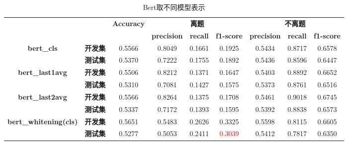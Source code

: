 \documentclass[11pt]{article}
\begin{document}
\begin{CJK}{UTF8}{gkai}
\begin{table}[htbp]\small
  \centering
  \begin{tabular}{cc|c|ccc|ccc}
    \hline
    \multicolumn{2}{c}{\multirow{2}[0]{*}{\textcolor[rgb]{ 1,  0,  0}{}}} & \multirow{2}[0]{*}{\textbf{Accuracy}} & \multicolumn{3}{c}{\textbf{离题}} & \multicolumn{3}{c}{\textbf{不离题}} \\
    \multicolumn{2}{c}{} &       & \textbf{precision} & \textbf{recall} & \textbf{f1-score} & \textbf{precision} & \textbf{recall} & \textbf{f1-score} \\
    \hline
    \multirow{2}[0]{*}{\textbf{bert\_cls}} & \textbf{开发集} & 0.5566  & 0.8049  & 0.1661  & 0.1925  & 0.5434  & 0.8717  & 0.6578  \\
    & \textbf{测试集} & 0.5370  & 0.7222  & 0.1755  & 0.1892  & 0.5436  & 0.8596  & 0.6447  \\
    \hline
    \multirow{2}[0]{*}{\textbf{bert\_last1avg}} & \textbf{开发集} & 0.5506  & 0.8212  & 0.1371  & 0.1647  & 0.5403  & 0.8892  & 0.6652  \\
    & \textbf{测试集} & 0.5310  & 0.7081  & 0.1427  & 0.1575  & 0.5373  & 0.8761  & 0.6516  \\
    \hline
    \multirow{2}[0]{*}{\textbf{bert\_last2avg}} & \textbf{开发集} & 0.5566  & 0.8264  & 0.1375  & 0.1708  & 0.5461  & 0.9018  & 0.6745  \\
    & \textbf{测试集} & 0.5337  & 0.7172  & 0.1393  & 0.1595  & 0.5392  & 0.8838  & 0.6573  \\
    \hline
    \multirow{2}[0]{*}{\textbf{bert\_whitening(cls)}} & \textbf{开发集} & 0.5651  & 0.5483  & 0.2626  & 0.3325  & 0.5598  & 0.8115  & 0.6605  \\
    & \textbf{测试集} & 0.5277  & 0.5053  & 0.2411  & \textcolor{red}{0.3039}  & 0.5412  & 0.7817  & 0.6350  \\
    \hline
  \end{tabular}%
  \caption{Bert取不同模型表示}
  \label{tab:addlabel}%
\end{table}%


%
%
%

\end{CJK}
\end{document}
